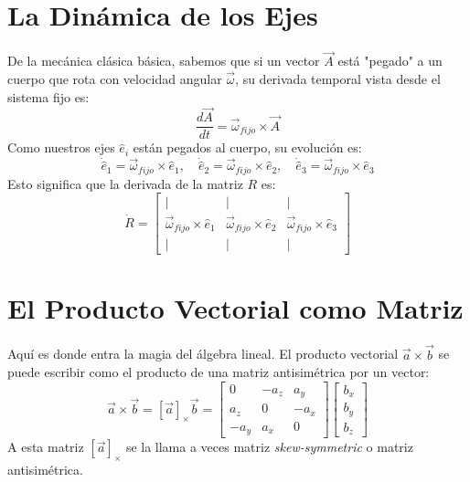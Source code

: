 \documentclass[12pt]{article}
\begin{document}
\section{La Dinámica de los Ejes}
De la mecánica clásica básica, sabemos que si un vector $\vec{A}$ está "pegado" a un cuerpo que rota con velocidad angular $\vec{\omega}$, su derivada temporal vista desde el sistema fijo es:
\begin{equation}
    \frac{d\vec{A}}{dt} = \vec{\omega}_{fijo} \times \vec{A}
\end{equation}
Como nuestros ejes $\hat{e}_i$ están pegados al cuerpo, su evolución es:
\begin{equation}
    \dot{\hat{e}}_1 = \vec{\omega}_{fijo} \times \hat{e}_1, \quad \dot{\hat{e}}_2 = \vec{\omega}_{fijo} \times \hat{e}_2, \quad \dot{\hat{e}}_3 = \vec{\omega}_{fijo} \times \hat{e}_3
\end{equation}
Esto significa que la derivada de la matriz $R$ es:
\begin{equation}
    \dot{R} = \begin{bmatrix} | & | & | \\ \vec{\omega}_{fijo} \times \hat{e}_1 & \vec{\omega}_{fijo} \times \hat{e}_2 & \vec{\omega}_{fijo} \times \hat{e}_3 \\ | & | & | \end{bmatrix}
\end{equation}

\section{El Producto Vectorial como Matriz}
Aquí es donde entra la magia del álgebra lineal. El producto vectorial $\vec{a} \times \vec{b}$ se puede escribir como el producto de una matriz antisimétrica por un vector:
\begin{equation}
    \vec{a} \times \vec{b} = [\vec{a}]_\times \vec{b} = \begin{bmatrix} 0 & -a_z & a_y \\ a_z & 0 & -a_x \\ -a_y & a_x & 0 \end{bmatrix} \begin{bmatrix} b_x \\ b_y \\ b_z \end{bmatrix}
\end{equation}
A esta matriz $[\vec{a}]_\times$ se la llama a veces matriz \textit{skew-symmetric} o matriz antisimétrica.
\end{document}
